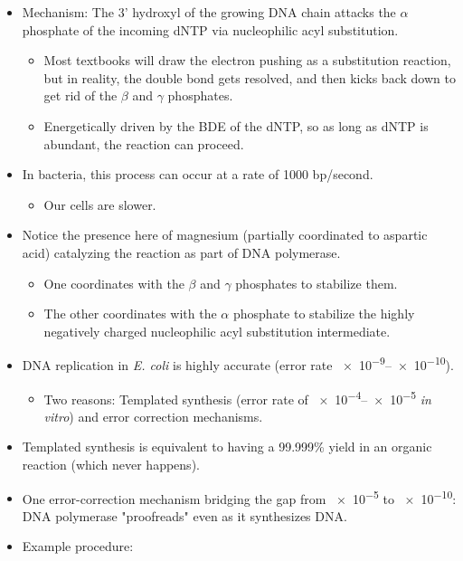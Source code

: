 \documentclass[../notes.tex]{subfiles}
\begin{document}
\begin{itemize}
\begin{itemize}
        \item Mechanism: The 3' hydroxyl of the growing DNA chain attacks the $\alpha$ phosphate of the incoming dNTP via nucleophilic acyl substitution.
        \begin{itemize}
            \item Most textbooks will draw the electron pushing as a substitution reaction, but in reality, the double bond gets resolved, and then kicks back down to get rid of the $\beta$ and $\gamma$ phosphates.
            \item Energetically driven by the BDE of the dNTP, so as long as dNTP is abundant, the reaction can proceed.
        \end{itemize}
        \item In bacteria, this process can occur at a rate of 1000 bp/second.
        \begin{itemize}
            \item Our cells are slower.
        \end{itemize}
        \item Notice the presence here of magnesium (partially coordinated to aspartic acid) catalyzing the reaction as part of DNA polymerase.
        \begin{itemize}
            \item One  coordinates with the $\beta$ and $\gamma$ phosphates to stabilize them.
            \item The other coordinates with the $\alpha$ phosphate to stabilize the highly negatively charged nucleophilic acyl substitution intermediate.
        \end{itemize}
        \item DNA replication in \emph{E. coli} is highly accurate (error rate \numrange{e-9}{e-10}).
        \begin{itemize}
            \item Two reasons: Templated synthesis (error rate of \numrange{e-4}{e-5} \emph{in vitro}) and error correction mechanisms.
        \end{itemize}
        \item Templated synthesis is equivalent to having a 99.999\% yield in an organic reaction (which never happens).
        \item One error-correction mechanism bridging the gap from \num{e-5} to \num{e-10}: DNA polymerase "proofreads" even as it synthesizes DNA.
        \item Example procedure:
        \begin{itemize}

\end{itemize}
\end{itemize}
\end{itemize}
\end{document}
